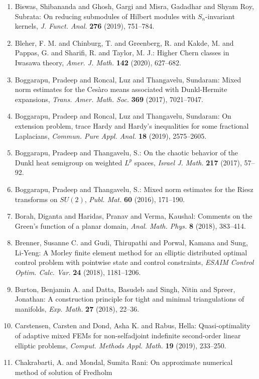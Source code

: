 \begin{enumerate}
{FEM} for the {O}seen problem, \emph{Comput. Methods Appl. Math.} {\bf 19} (2019), 189--214.
\item Biswas, Shibananda and Ghosh, Gargi and Misra, Gadadhar and
Shyam Roy, Subrata: On reducing submodules of {H}ilbert modules with
{${S}_n$}-invariant kernels, \emph{J. Funct. Anal.} {\bf 276} (2019), 751--784.
\item Bleher, F. M. and Chinburg, T. and Greenberg, R. and Kakde, M.
and Pappas, G. and Sharifi, R. and Taylor, M. J.: Higher {C}hern classes in {I}wasawa theory, \emph{Amer. J. Math.} {\bf 142} (2020), 627--682.
\item Boggarapu, Pradeep and Roncal, Luz and Thangavelu, Sundaram: Mixed norm estimates for the {C}es\`aro means associated with
{D}unkl-{H}ermite expansions, \emph{Trans. Amer. Math. Soc.} {\bf 369} (2017), 7021--7047.
\item Boggarapu, Pradeep and Roncal, Luz and Thangavelu, Sundaram: On extension problem, trace {H}ardy and {H}ardy's inequalities
for some fractional {L}aplacians, \emph{Commun. Pure Appl. Anal.} {\bf 18} (2019), 2575--2605.
\item Boggarapu, Pradeep and Thangavelu, S.: On the chaotic behavior of the {D}unkl heat semigroup on
weighted {$L^p$} spaces, \emph{Israel J. Math.} {\bf 217} (2017), 57--92.
\item Boggarapu, Pradeep and Thangavelu, S.: Mixed norm estimates for the {R}iesz transforms on {$SU(2)$}, \emph{Publ. Mat.} {\bf 60} (2016), 171--190.
\item Borah, Diganta and Haridas, Pranav and Verma, Kaushal: Comments on the {G}reen's function of a planar domain, \emph{Anal. Math. Phys.} {\bf 8} (2018), 383--414.
\item Brenner, Susanne C. and Gudi, Thirupathi and Porwal, Kamana
and Sung, Li-Yeng: A {M}orley finite element method for an elliptic distributed
optimal control problem with pointwise state and control
constraints, \emph{ESAIM Control Optim. Calc. Var.} {\bf 24} (2018), 1181--1206.
\item Burton, Benjamin A. and Datta, Basudeb and Singh, Nitin and
Spreer, Jonathan: A construction principle for tight and minimal triangulations
of manifolds, \emph{Exp. Math.} {\bf 27} (2018), 22--36.
\item Carstensen, Carsten and Dond, Asha K. and Rabus, Hella: Quasi-optimality of adaptive mixed {FEM}s for non-selfadjoint
indefinite second-order linear elliptic problems, \emph{Comput. Methods Appl. Math.} {\bf 19} (2019), 233--250.
\item Chakrabarti, A. and Mondal, Sumita Rani: On approximate numerical method of solution of {F}redholm

\end{enumerate}
